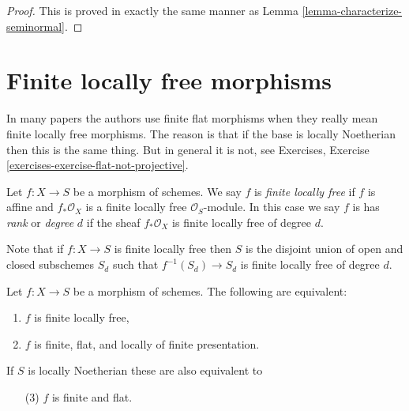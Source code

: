 \begin{proof}
This is proved in exactly the same manner as
Lemma \ref{lemma-characterize-seminormal}.
\end{proof}





\section{Finite locally free morphisms}
\label{section-finite-locally-free}

\noindent
In many papers the authors use finite flat morphisms when they really mean
finite locally free morphisms. The reason is that if the base is locally
Noetherian then this is the same thing. But in general it is not, see
Exercises, Exercise \ref{exercises-exercise-flat-not-projective}.

\begin{definition}
\label{definition-finite-locally-free}
Let $f : X \to S$ be a morphism of schemes.
We say $f$ is {\it finite locally free} if $f$ is
affine and $f_*\mathcal{O}_X$ is a finite locally
free $\mathcal{O}_S$-module. In this case we say $f$ is
has {\it rank} or {\it degree} $d$
if the sheaf $f_*\mathcal{O}_X$ is finite locally free of degree $d$.
\end{definition}

\noindent
Note that if $f : X \to S$ is finite locally free then $S$ is the disjoint
union of open and closed subschemes $S_d$ such that $f^{-1}(S_d) \to S_d$
is finite locally free of degree $d$.

\begin{lemma}
\label{lemma-finite-flat}
Let $f : X \to S$ be a morphism of schemes.
The following are equivalent:
\begin{enumerate}
\item $f$ is finite locally free,
\item $f$ is finite, flat, and locally of finite presentation.
\end{enumerate}
If $S$ is locally Noetherian these are also equivalent to
\begin{enumerate}
\item[(3)] $f$ is finite and flat.
\end{enumerate}
\end{lemma}

